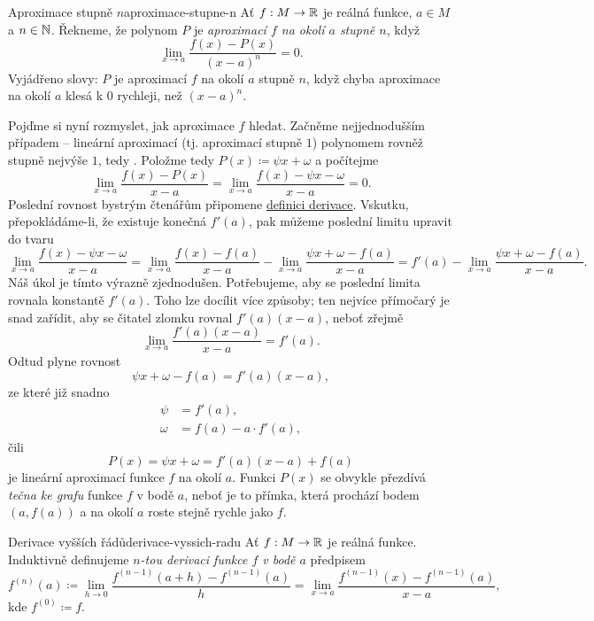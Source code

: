 \begin{definition}{Aproximace stupně $n$}{aproximace-stupne-n}
 Ať $f:M \to \mathbb{R}$ je reálná funkce, $a \in M$ a $n \in \mathbb{N}$. Řekneme, že polynom
 $P$ je \emph{aproximací $f$ na okolí $a$ stupně $n$}, když
 \[
  \lim_{x \to a} \frac{f(x) - P(x)}{(x-a)^{n}} = 0.
 \]
 Vyjádřeno slovy: $P$ je aproximací $f$ na okolí $a$ stupně $n$, když chyba
 aproximace na okolí $a$ klesá k $0$ rychleji, než $(x-a)^{n}$.
\end{definition}

Pojďme si nyní rozmyslet, jak aproximace $f$ hledat. Začněme nejjednodušším
případem -- lineární aproximací (tj. aproximací stupně $1$) polynomem rovněž
stupně nejvýše $1$, tedy . Položme tedy $P(x) \coloneqq \psi x +
\omega$ a počítejme
\[
 \lim_{x \to a} \frac{f(x) - P(x)}{x - a} = \lim_{x \to a} \frac{f(x) - \psi x -
 \omega}{x - a} = 0.
\]
Poslední rovnost bystrým čtenářům připomene \hyperref[def:derivace-funkce]{definici
derivace}. Vskutku, přepokládáme-li, že existuje konečná $f'(a)$, pak můžeme
poslední limitu upravit do tvaru
\[
 \lim_{x \to a} \frac{f(x) - \psi x - \omega}{x - a} = \lim_{x \to a} \frac{f(x)
 - f(a)}{x-a} - \lim_{x \to a} \frac{\psi x + \omega - f(a)}{x-a} = f'(a) -
 \lim_{x \to a} \frac{\psi x + \omega - f(a)}{x - a}.
\]
Náš úkol je tímto výrazně zjednodušen. Potřebujeme, aby se poslední limita
rovnala konstantě $f'(a)$. Toho lze docílit více způsoby; ten nejvíce přímočarý
je snad zařídit, aby se čitatel zlomku rovnal $f'(a)(x-a)$, neboť zřejmě
\[
 \lim_{x \to a} \frac{f'(a)(x-a)}{x-a} = f'(a).
\]
Odtud plyne rovnost
\[
 \psi x + \omega - f(a) = f'(a)(x-a),
\]
ze které již snadno
\begin{align*}
 \psi &= f'(a),\\
 \omega &= f(a) - a \cdot f'(a),
\end{align*}
čili
\[
 P(x) = \psi x + \omega = f'(a)(x - a) + f(a)
\]
je lineární aproximací funkce $f$ na okolí $a$. Funkci $P(x)$ se obvykle
přezdívá \emph{tečna ke grafu} funkce $f$ v bodě $a$, neboť je to přímka, která
prochází bodem $(a,f(a))$ a na okolí $a$ roste stejně rychle jako $f$.

\begin{definition}{Derivace vyšších řádů}{derivace-vyssich-radu}
 Ať $f:M \to \mathbb{R}$ je reálná funkce. Induktivně definujeme \emph{$n$-tou derivaci
 funkce $f$ v bodě $a$} předpisem
 \[
  f^{(n)}(a) \coloneqq \lim_{h \to 0} \frac{f^{(n-1)}(a + h) - f^{(n -
  1)}(a)}{h} = \lim_{x \to a} \frac{f^{(n-1)}(x) - f^{(n-1)}(a)}{x-a},
 \]
 kde $f^{(0)} \coloneqq f$.
\end{definition}

